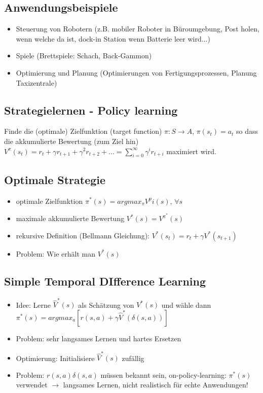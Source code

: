 \documentclass[paper=a4, fontsize=11pt]{scrartcl} %
\numberwithin{equation}{section} %
\numberwithin{figure}{section} %
\numberwithin{table}{section} %
\begin{document}
\subsection{Anwendungsbeispiele}
\begin{itemize}
\item Steuerung von Robotern (z.B. mobiler Roboter in Büroumgebung, Post holen, wenn welche da ist, dock-in Station wenn Batterie leer wird...)
\item Spiele (Brettspiele: Schach, Back-Gammon)
\item Optimierung und Planung (Optimierungen von Fertigungsprozessen, Planung Taxizentrale)
\end{itemize}

\subsection{Strategielernen - Policy learning}

Finde die (optimale) Zielfunktion (target function) $\pi: S \rightarrow A$, $\pi(s_t) = a_t$ so dass die akkumulierte Bewertung (zum Ziel hin) $V^\pi(s_t) = r_t + \gamma r_{t+1} + \gamma^2 r_{t+2} + ... = \sum\limits_{i=0}^\infty \gamma^i r_{t+i}$ maximiert wird.

\subsection{Optimale Strategie}

\begin{itemize}
\item optimale Zielfunktion $\pi^*(s) = arg max_\pi V^pi(s)$, $\forall s$
\item maximale akkumulierte Bewertung $V^*(s) = V^{\pi^*}(s)$
\item rekursive Definition (Bellmann Gleichung): $V^*(s_t) = r_t + \gamma V^*(s_{t+1})$
\item Problem: Wie erhält man $V^*(s)$
\end{itemize}

\subsection{Simple Temporal DIfference Learning}

\begin{itemize}
\item Idee: Lerne $\hat{V}^*(s)$ als Schätzung von $V^*(s)$ und wähle dann $\pi^*(s) = arg max_a [r(s,a)+\gamma \hat{V}^*(\delta(s,a))]$
\item Problem: sehr langsames Lernen und hartes Ersetzen
\item Optimierung: Initialisiere $\hat{V}^*(s)$ zufällig
\item Problem: $r(s,a) \delta(s,a)$ müssen bekannt sein, on-policy-learning: $\pi^*(s)$ verwendet $\rightarrow$ langsames Lernen, nicht realistisch für echte Anwendungen!
\end{itemize}
\end{document}
